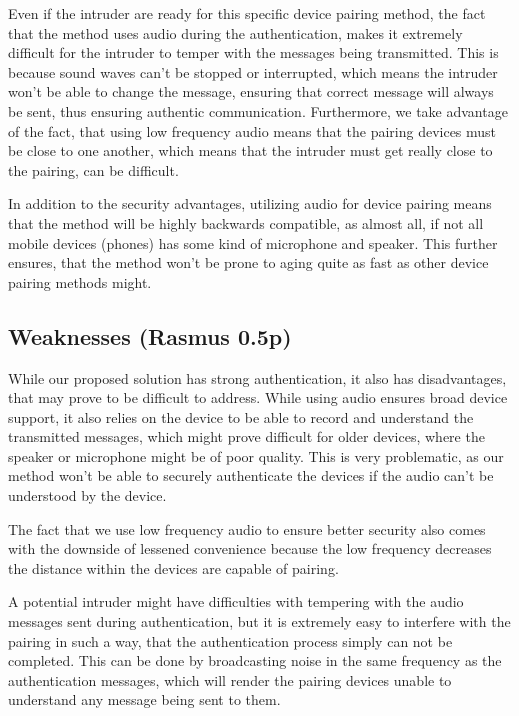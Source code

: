 \documentclass[12pt]{article}
\begin{document}
Even if the intruder are ready for this specific device pairing method, the fact that the method uses audio during the authentication, makes it extremely difficult for the intruder to temper with the messages being transmitted. This is because sound waves can't be stopped or interrupted, which means the intruder won't be able to change the message, ensuring that correct message will always be sent, thus ensuring authentic communication. Furthermore, we take advantage of the fact, that using low frequency audio means that the pairing devices must be close to one another, which means that the intruder must get really close to the pairing, can be difficult.

In addition to the security advantages, utilizing audio for device pairing means that the method will be highly backwards compatible, as almost all, if not all mobile devices (phones) has some kind of microphone and speaker. This further ensures, that the method won't be prone to aging quite as fast as other device pairing methods might.


\subsection{Weaknesses (Rasmus 0.5p)}
\label{sub:Weaknesses}

While our proposed solution has strong authentication, it also has disadvantages, that may prove to be difficult to address. While using audio ensures broad device support, it also relies on the device to be able to record and understand the transmitted messages, which might prove difficult for older devices, where the speaker or microphone might be of poor quality. This is very problematic, as our method won't be able to securely authenticate the devices if the audio can't be understood by the device.

The fact that we use low frequency audio to ensure better security also comes with the downside of lessened convenience because the low frequency decreases the distance within the devices are capable of pairing.

A potential intruder might have difficulties with tempering with the audio messages sent during authentication, but it is extremely easy to interfere with the pairing in such a way, that the authentication process simply can not be completed. This can be done by broadcasting noise in the same frequency as the authentication messages, which will render the pairing devices unable to understand any message being sent to them.
\end{document}
